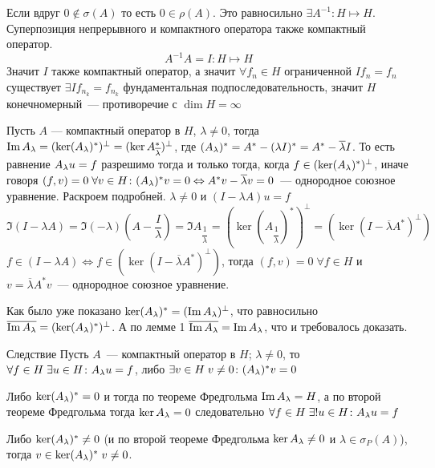 \documentclass[14pt]{extarticle}
\begin{document}
\noindent Если вдруг $0 \notin \sigma(A)$ то есть $0 \in \rho(A)$.
Это равносильно $\exists A^{-1} : H \mapsto H$.
Суперпозиция непрерывного и компактного оператора также компактный оператор.
$$
A^{-1} A = I : H \mapsto H
$$
Значит $I$ также компактный оператор, а значит $\forall f_n \in H$ 
ограниченной $I f_n = f_n$ существует $\exists I f_{n_k} = f_{n_k}$ 
фундаментальная подпоследовательность, значит $H$ конечномерный~--- 
противоречие с $\dim H = \infty$
\begin{Theor}
    Пусть $A$ --- компактный оператор в $H$, $\lambda \ne 0$, тогда $\Im \Al =
    (\ker (\Al)^*)^\perp = (\ker A^*_{\overline{\lambda}})^\perp$,
    где $(\Al)^* = A^* - (\lambda I)^* = A^* - \overline{\lambda} I$.
    То есть равнение $\Al u = f$ разрешимо тогда и только тогда, когда
    $f \in (\ker(\Al)^*)^\perp$, иначе говоря $(f, v) = 0\; \forall v \in H
    \colon (\Al)^*v = 0 \Leftrightarrow A^*v - \overline{\lambda}v = 0$~--- 
    однородное союзное уравнение.
    Раскроем подробней.
    $\lambda \ne 0$ и $(I - \lambda A)u = f$
    $$
    \Im (I - \lambda A) = \Im (-\lambda)(A - \dfrac{I}{\lambda}) =
    \Im A_{\dfrac{1}{\lambda}} = (\ker(A_{\dfrac{1}{\lambda}})^*)^\perp = 
    (\ker(I - \overline{\lambda}A^*)^\perp)
    $$
    $f \in (I - \lambda A) \Leftrightarrow f \in (\ker(I - \overline{\lambda}
    A^*)^\perp)$, тогда $(f, v) = 0\; \forall f \in H$ и $v = 
    \overline{\lambda} A^*v$~--- однородное союзное уравнение.
\end{Theor}
\begin{Proof}
    Как было уже показано $\ker (\Al)^* = (\Im \Al)^\perp$, что равносильно
    $\overline{\Im \Al} = (\ker (\Al)^*)^\perp$.
    А по лемме 1 $\overline{\Im \Al} = \Im \Al$, что и требовалось доказать.
\end{Proof}
\begin{MathCl}{Следствие}
    Пусть $A$~--- компактный оператор в $H$; $\lambda \ne 0$, то $\forall f 
    \in H\;\exists u \in H\colon \Al u = f$, либо $\exists v \in H\; v \ne 0
    \colon (\Al)^* v = 0$
\end{MathCl}
\begin{Proof}
    Либо $\ker(\Al)^* = 0$ и тогда по теореме Фредгольма $\Im \Al = H$, а по
    второй теореме Фредгольма тогда $\ker \Al = 0$ следовательно $\forall f 
    \in H\;\exists!u \in H \colon \Al u = f$
    
    Либо $\ker(\Al)^* \ne 0$ (и по второй теореме Фредгольма $\ker \Al \ne 0$
    и $\lambda \in \sigma_P(A)$), тогда $v \in \ker (\Al)^*\; v \ne 0$.
\end{Proof}
\end{document}
